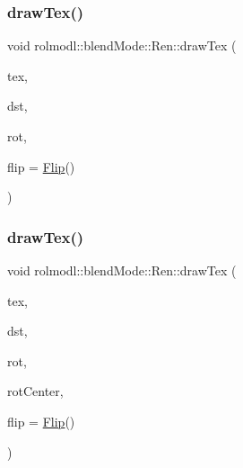 \subsubsection{\texorpdfstring{drawTex()}{drawTex()}\hspace{0.1cm}{\footnotesize\ttfamily [22/36]}}
{\footnotesize\ttfamily void rolmodl\+::blend\+Mode\+::\+Ren\+::draw\+Tex (\begin{DoxyParamCaption}\item[{Tex \&}]{tex,  }\item[{const \mbox{\hyperlink{structrolmodl_1_1blend_mode_1_1_dst_rect_x_y}{Dst\+Rect\+XY}}}]{dst,  }\item[{const double}]{rot,  }\item[{const \mbox{\hyperlink{structrolmodl_1_1blend_mode_1_1_flip}{Flip}}}]{flip = {\ttfamily \mbox{\hyperlink{structrolmodl_1_1blend_mode_1_1_flip}{Flip}}()} }\end{DoxyParamCaption})}

\mbox{\label{classrolmodl_1_1blend_mode_1_1_ren_ad90e1b5a6184e980e59a631bf6e5bae6}} 
\subsubsection{\texorpdfstring{drawTex()}{drawTex()}\hspace{0.1cm}{\footnotesize\ttfamily [23/36]}}
{\footnotesize\ttfamily void rolmodl\+::blend\+Mode\+::\+Ren\+::draw\+Tex (\begin{DoxyParamCaption}\item[{Tex \&}]{tex,  }\item[{const \mbox{\hyperlink{structrolmodl_1_1blend_mode_1_1_dst_rect_w_h}{Dst\+Rect\+WH}}}]{dst,  }\item[{const double}]{rot,  }\item[{const \mbox{\hyperlink{structrolmodl_1_1geom_1_1_pos}{geom\+::\+Pos}}}]{rot\+Center,  }\item[{const \mbox{\hyperlink{structrolmodl_1_1blend_mode_1_1_flip}{Flip}}}]{flip = {\ttfamily \mbox{\hyperlink{structrolmodl_1_1blend_mode_1_1_flip}{Flip}}()} }\end{DoxyParamCaption})}

\mbox{\label{classrolmodl_1_1blend_mode_1_1_ren_ab9463503cd984058ccfd07f23828cdcd}} 
